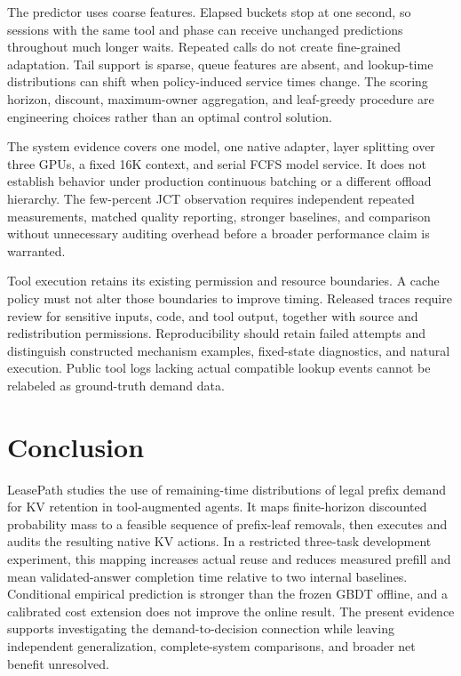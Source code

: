 \documentclass[sigconf, screen, review]{acmart}
\begin{document}
The predictor uses coarse features. Elapsed buckets stop at one second,
so sessions with the same tool and phase can receive unchanged
predictions throughout much longer waits. Repeated calls do not create
fine-grained adaptation. Tail support is sparse, queue features are
absent, and lookup-time distributions can shift when policy-induced
service times change. The scoring horizon, discount, maximum-owner
aggregation, and leaf-greedy procedure are engineering choices rather
than an optimal control solution.

The system evidence covers one model, one native adapter, layer
splitting over three GPUs, a fixed 16K context, and serial FCFS model
service. It does not establish behavior under production continuous
batching or a different offload hierarchy. The few-percent JCT
observation requires independent repeated measurements, matched quality
reporting, stronger baselines, and comparison without unnecessary
auditing overhead before a broader performance claim is warranted.

Tool execution retains its existing permission and resource boundaries.
A cache policy must not alter those boundaries to improve timing.
Released traces require review for sensitive inputs, code, and tool
output, together with source and redistribution permissions.
Reproducibility should retain failed attempts and distinguish
constructed mechanism examples, fixed-state diagnostics, and natural
execution. Public tool logs lacking actual compatible lookup events
cannot be relabeled as ground-truth demand data.

\section{Conclusion}\label{conclusion}

LeasePath studies the use of remaining-time distributions of legal
prefix demand for KV retention in tool-augmented agents. It maps
finite-horizon discounted probability mass to a feasible sequence of
prefix-leaf removals, then executes and audits the resulting native KV
actions. In a restricted three-task development experiment, this mapping
increases actual reuse and reduces measured prefill and mean
validated-answer completion time relative to two internal baselines.
Conditional empirical prediction is stronger than the frozen GBDT
offline, and a calibrated cost extension does not improve the online
result. The present evidence supports investigating the
demand-to-decision connection while leaving independent generalization,
complete-system comparisons, and broader net benefit unresolved.
\end{document}
